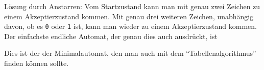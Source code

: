 \begin{loesung}
Lösung durch Anstarren: Vom Startzustand kann man mit genau zwei Zeichen
zu einem Akzeptierzustand kommen.
Mit genau drei weiteren Zeichen, unabhängig davon, ob es \texttt{0} oder
\texttt{1} ist, kann man wieder zu einem Akzeptierzustand kommen.
Der einfachste endliche Automat, der genau dies auch ausdrückt, ist
\begin{center}
\def\r{0.35}
\def\zustand#1#2{
	\ifthenelse{\boolean{loesungen}}{
		\fill[color=#2!20] #1 circle[radius=\r];
	}{
		\fill[color=white] #1 circle[radius=\r];
	}
	\draw #1 circle[radius=\r];
}
\def\akzeptierzustand#1#2{
	\ifthenelse{\boolean{loesungen}}{
		\fill[color=#2!20] #1 circle[radius=\r];
	}{
		\fill[color=white] #1 circle[radius=\r];
	}
	\draw #1 circle[radius=\r];
	\draw #1 circle[radius={\r-0.05}];
}
\def\pfeil#1{
	\draw[->,shorten >= 0.35cm,shorten <= 0.35cm] #1 -- ($#1+(2,0)$);
	\node at ($#1+(1,0)$) [above] {\texttt{0},\texttt{1}};
}
\end{center}
Dies ist der der Minimalautomat, den man auch mit dem ``Tabellenalgorithmus''
finden können sollte.


\end{loesung}
